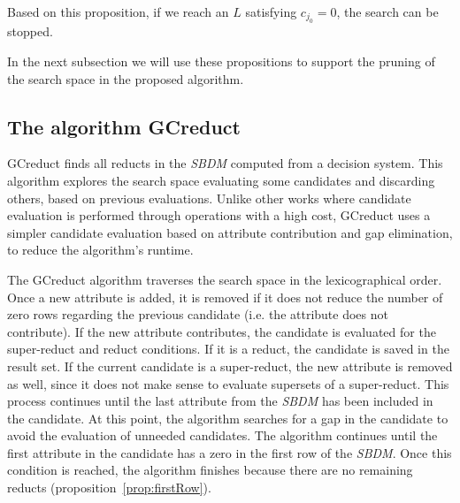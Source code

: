 \documentclass[number,preprint,review,12pt]{elsarticle}
\newtheorem{corollary}{Corollary}
\begin{document}
	Based on this proposition, if we reach an $L$ satisfying $c_{j_0}=0$, the search can be stopped. 

%	
	
	In the next subsection we will use these propositions to support the pruning of the search space in the proposed algorithm.

\subsection{The algorithm GCreduct}\label{description}
	GCreduct finds all reducts in the \textit{SBDM} computed from a decision system. This algorithm explores the search space evaluating some candidates and discarding others, based on previous evaluations. Unlike other works \citep{WangP07,Lias13} where candidate evaluation is performed through operations with a high cost, GCreduct uses a simpler candidate evaluation based on attribute contribution and gap elimination, to reduce the algorithm's runtime. 
	
	\label{abstarct}
	The GCreduct algorithm traverses the search space in the lexicographical order. Once a new attribute is added, it is removed if it does not reduce the number of zero rows regarding the previous candidate (i.e. the attribute does not contribute). If the new attribute contributes, the candidate is evaluated for the super-reduct and reduct conditions. If it is a reduct, the candidate is saved in the result set. If the current candidate is a super-reduct, the new attribute is removed as well, since it does not make sense to evaluate supersets of a super-reduct. This process continues until the last attribute from the \textit{SBDM} has been included in the candidate. At this point, the algorithm searches for a gap in the candidate to avoid the evaluation of unneeded candidates. The algorithm continues until the first attribute in the candidate has a zero in the first row of the \textit{SBDM}. Once this condition is reached, the algorithm finishes because there are no remaining reducts (proposition~\ref{prop:firstRow}).
	
\end{document}
